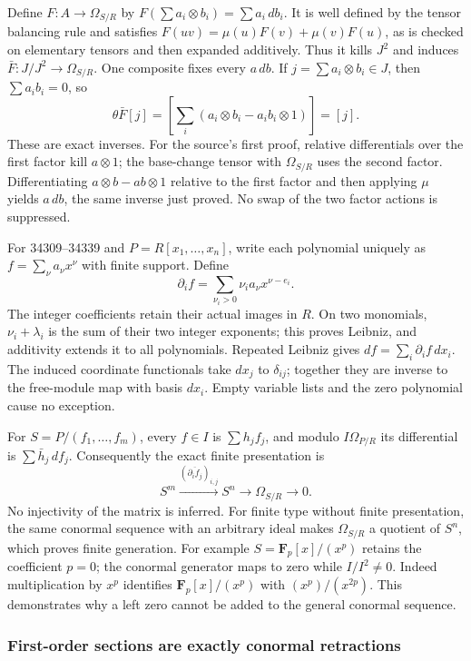 Define \(F:A\to\Omega_{S/R}\) by \(F(\sum a_i\otimes b_i)=\sum a_i\,db_i\). It is well defined by the tensor balancing rule and satisfies \(F(uv)=\mu(u)F(v)+\mu(v)F(u)\), as is checked on elementary tensors and then expanded additively. Thus it kills \(J^2\) and induces \(\bar F:J/J^2\to\Omega_{S/R}\). One composite fixes every \(a\,db\). If \(j=\sum a_i\otimes b_i\in J\), then \(\sum a_ib_i=0\), so \[
\theta\bar F[j]=\left[\sum_i(a_i\otimes b_i-a_ib_i\otimes1)\right]=[j].
\] These are exact inverses. For the source's first proof, relative differentials over the first factor kill \(a\otimes1\); the base-change tensor with \(\Omega_{S/R}\) uses the second factor. Differentiating \(a\otimes b-ab\otimes1\) relative to the first factor and then applying \(\mu\) yields \(a\,db\), the same inverse just proved. No swap of the two factor actions is suppressed.

For 34309--34339 and \(P=R[x_1,\ldots,x_n]\), write each polynomial uniquely as \(f=\sum_\nu a_\nu x^\nu\) with finite support. Define \[
\partial_i f=\sum_{\nu_i>0}\nu_i a_\nu x^{\nu-e_i}.
\] The integer coefficients retain their actual images in \(R\). On two monomials, \(\nu_i+\lambda_i\) is the sum of their two integer exponents; this proves Leibniz, and additivity extends it to all polynomials. Repeated Leibniz gives \(df=\sum_i\partial_i f\,dx_i\). The induced coordinate functionals take \(dx_j\) to \(\delta_{ij}\); together they are inverse to the free-module map with basis \(dx_i\). Empty variable lists and the zero polynomial cause no exception.

For \(S=P/(f_1,\ldots,f_m)\), every \(f\in I\) is \(\sum h_jf_j\), and modulo \(I\Omega_{P/R}\) its differential is \(\sum\bar h_j\,df_j\). Consequently the exact finite presentation is \[
S^m\xrightarrow{(\overline{\partial_i f_j})_{i,j}}S^n\longrightarrow\Omega_{S/R}\longrightarrow0.
\] No injectivity of the matrix is inferred. For finite type without finite presentation, the same conormal sequence with an arbitrary ideal makes \(\Omega_{S/R}\) a quotient of \(S^n\), which proves finite generation. For example \(S=\mathbf F_p[x]/(x^p)\) retains the coefficient \(p=0\); the conormal generator maps to zero while \(I/I^2\ne0\). Indeed multiplication by \(x^p\) identifies \(\mathbf F_p[x]/(x^p)\) with \((x^p)/(x^{2p})\). This demonstrates why a left zero cannot be added to the general conormal sequence.

\subsubsection{First-order sections are exactly conormal retractions}\label{algebra-proof-041-first-order-sections-are-exactly-conormal-retractions}

